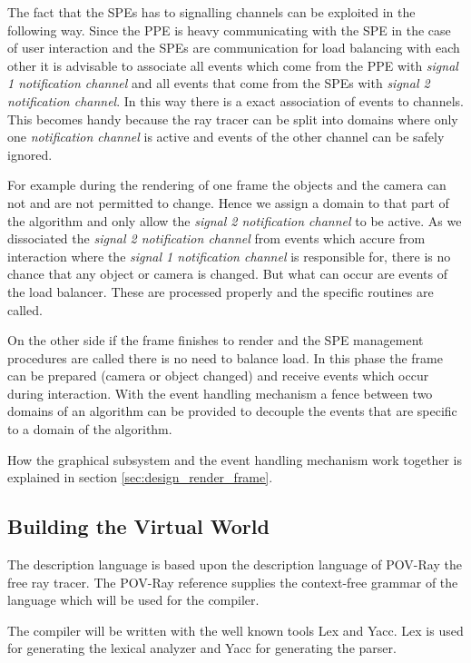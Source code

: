 \documentclass[DIV10, abstracton, openright, footsepline, headsepline, twoside, 9pt,
bigheadings]{scrreprt}
\begin{document}
The fact that the SPEs has to signalling channels can be exploited in the following
way. Since the PPE is heavy communicating with the SPE in the case of user
interaction and the SPEs are communication for load balancing with each other it is
advisable to associate all events which come from the PPE with
\textit{signal 1 notification channel}
and all events that come from the SPEs with \textit{signal 2 notification channel}.
In this way
 there is a exact association of events to channels. This becomes handy because
the ray tracer can be split into domains where only one \textit{notification channel}
is active and events of the other channel can be safely ignored.

For example during the rendering of one frame the objects and the camera can not and
are not permitted to change. Hence we assign a domain to that part of the algorithm
and only allow the \textit{signal 2 notification channel} to be active. As we
dissociated the \textit{signal 2 notification channel} from events which accure from
interaction where the \textit{signal 1 notification channel} is responsible for,
there is no chance that any object or camera is changed. But what can
occur are events of the load balancer. These are processed properly and the specific
routines are called.

On the other side if the frame finishes to render and the SPE management procedures
are called  there is no need to balance load. In this phase the frame can be
prepared (camera or object changed) and receive events which occur during
interaction. With the event handling mechanism a fence between two domains of
 an algorithm can be provided to decouple the events that are specific to a domain
of the algorithm.


How the graphical subsystem and the event handling mechanism work together is
explained in section \ref{sec:design_render_frame}.

\subsection{Building the Virtual World}
The description language is based upon the description language of POV-Ray the
free ray tracer. The POV-Ray reference supplies the context-free grammar of the
language which will be used for the compiler.

The compiler will be written with the well known tools Lex and
Yacc. Lex is used for generating the lexical analyzer and Yacc
for generating the parser.
\end{document}
